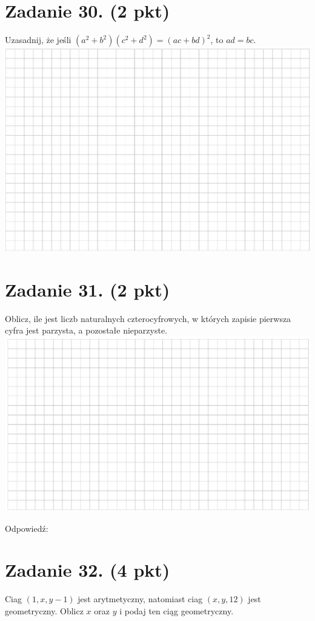\documentclass[10pt]{article}
\begin{document}
\section*{Zadanie 30. (2 pkt)}
Uzasadnij, że jeśli \(\left(a^{2}+b^{2}\right)\left(c^{2}+d^{2}\right)=(a c+b d)^{2}\), to \(a d=b c\).\\
\includegraphics[max width=\textwidth, center]{2024_11_21_603d5c1b2a7d8d68f45fg-15(1)}

\section*{Zadanie 31. (2 pkt)}
Oblicz, ile jest liczb naturalnych czterocyfrowych, w których zapisie pierwsza cyfra jest parzysta, a pozostałe nieparzyste.\\
\includegraphics[max width=\textwidth, center]{2024_11_21_603d5c1b2a7d8d68f45fg-15}

Odpowiedź:

\section*{Zadanie 32. (4 pkt)}
Ciag \((1, x, y-1)\) jest arytmetyczny, natomiast ciag \((x, y, 12)\) jest geometryczny. Oblicz \(x\) oraz \(y\) i podaj ten ciąg geometryczny.
\end{document}
